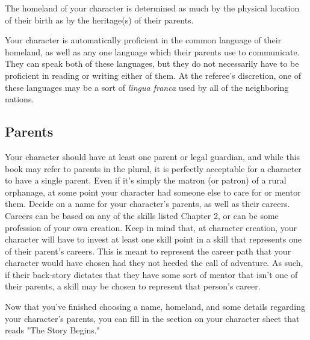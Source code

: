 \documentclass[oneside]{book}
\begin{document}
\begin{multicols}{2}
The homeland of your character is determined as much by the physical location of their birth as by the heritage(s) of their parents. 

Your character is automatically proficient in the common language of their homeland, as well as any one language which their parents use to communicate. They can speak both of these languages, but they do not necessarily have to be proficient in reading or writing either of them. At the referee's discretion, one of these languages may be a sort of \emph{lingua franca} used by all of the neighboring nations. 

\subsection{Parents}
Your character should have at least one parent or legal guardian, and while this book may refer to parents in the plural, it is perfectly acceptable for a character to have a single parent. Even if it's simply the matron (or patron) of a rural orphanage, at some point your character had someone else to care for or mentor them. Decide on a name for your character's parents, as well as their careers. Careers can be based on any of the skills listed Chapter 2, or can be some profession of your own creation. Keep in mind that, at character creation, your character will have to invest at least one skill point in a skill that represents one of their parent's careers. This is meant to represent the career path that your character would have chosen had they not heeded the call of adventure. As such, if their back-story dictates that they have some sort of mentor that isn't one of their parents, a skill may be chosen to represent that person's career.

Now that you've finished choosing a name, homeland, and some details regarding your character's parents, you can fill in the section on your character sheet that reads "The Story Begins."


\end{multicols}
\end{document}
